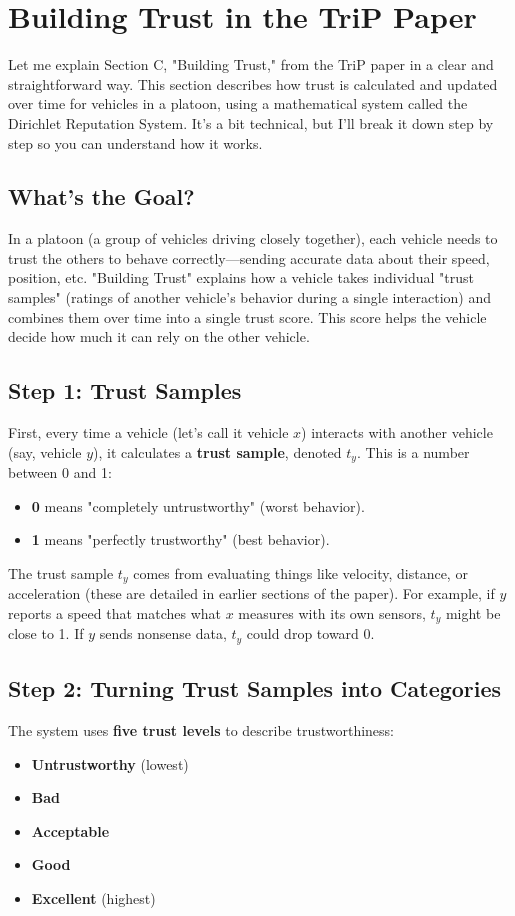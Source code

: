 \documentclass{article}
\begin{document}
\section*{Building Trust in the TriP Paper}

Let me explain Section C, "Building Trust," from the TriP paper in a clear and straightforward way. This section describes how trust is calculated and updated over time for vehicles in a platoon, using a mathematical system called the Dirichlet Reputation System. It's a bit technical, but I'll break it down step by step so you can understand how it works.

\subsection*{What's the Goal?}
In a platoon (a group of vehicles driving closely together), each vehicle needs to trust the others to behave correctly—sending accurate data about their speed, position, etc. "Building Trust" explains how a vehicle takes individual "trust samples" (ratings of another vehicle's behavior during a single interaction) and combines them over time into a single trust score. This score helps the vehicle decide how much it can rely on the other vehicle.

\subsection*{Step 1: Trust Samples}
First, every time a vehicle (let's call it vehicle \(x\)) interacts with another vehicle (say, vehicle \(y\)), it calculates a \textbf{trust sample}, denoted \(t_y\). This is a number between 0 and 1:
\begin{itemize}
    \item \textbf{0} means "completely untrustworthy" (worst behavior).
    \item \textbf{1} means "perfectly trustworthy" (best behavior).
\end{itemize}

The trust sample \(t_y\) comes from evaluating things like velocity, distance, or acceleration (these are detailed in earlier sections of the paper). For example, if \(y\) reports a speed that matches what \(x\) measures with its own sensors, \(t_y\) might be close to 1. If \(y\) sends nonsense data, \(t_y\) could drop toward 0.

\subsection*{Step 2: Turning Trust Samples into Categories}
The system uses \textbf{five trust levels} to describe trustworthiness:
\begin{itemize}
    \item \textbf{Untrustworthy} (lowest)
    \item \textbf{Bad}
    \item \textbf{Acceptable}
    \item \textbf{Good}
    \item \textbf{Excellent} (highest)
\end{itemize}
\end{document}
